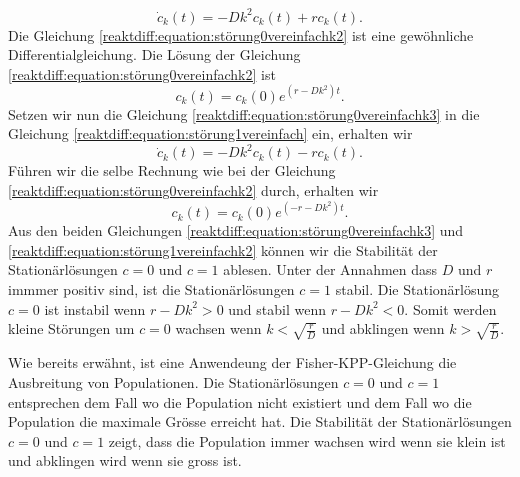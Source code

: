 \begin{equation}
\label{reaktdiff:equation:störung0vereinfachk2}
\dot{c}_k(t) = -D k^2 c_k(t) + r c_k(t).
\end{equation}
Die Gleichung \ref{reaktdiff:equation:störung0vereinfachk2} ist eine gewöhnliche Differentialgleichung.
Die Lösung der Gleichung \ref{reaktdiff:equation:störung0vereinfachk2} ist
\begin{equation}
\label{reaktdiff:equation:störung0vereinfachk3}
c_k(t) = c_k(0) e^{(r - D k^2)t}.
\end{equation}
Setzen wir nun die Gleichung \ref{reaktdiff:equation:störung0vereinfachk3} in die Gleichung \ref{reaktdiff:equation:störung1vereinfach} ein, erhalten wir
\begin{equation}
\label{reaktdiff:equation:störung1vereinfachk}
\dot{c}_k(t) = -D k^2 c_k(t) - r c_k(t).
\end{equation}
Führen wir die selbe Rechnung wie bei der Gleichung \ref{reaktdiff:equation:störung0vereinfachk2} durch, erhalten wir
\begin{equation}
\label{reaktdiff:equation:störung1vereinfachk2}
c_k(t) = c_k(0) e^{(-r - D k^2)t}.
\end{equation}
Aus den beiden Gleichungen \ref{reaktdiff:equation:störung0vereinfachk3} und \ref{reaktdiff:equation:störung1vereinfachk2} können wir die Stabilität der Stationärlösungen \(c = 0\) und \(c = 1\) ablesen.
Unter der Annahmen dass \(D\) und \(r\) immmer positiv sind, ist die Stationärlösungen \(c = 1\) stabil.
Die Stationärlösung \(c = 0\) ist instabil wenn \(r-Dk^2 > 0\) und stabil wenn \(r-Dk^2 < 0\).
Somit werden kleine Störungen um \(c = 0\) wachsen wenn \(k < \sqrt{\frac{r}{D}}\) und abklingen wenn \(k > \sqrt{\frac{r}{D}}\).

Wie bereits erwähnt, ist eine Anwendeung der Fisher-KPP-Gleichung die Ausbreitung von Populationen.
Die Stationärlösungen \(c = 0\) und \(c = 1\) entsprechen dem Fall wo die Population nicht existiert und dem Fall wo die Population die maximale Grösse erreicht hat.
Die Stabilität der Stationärlösungen \(c = 0\) und \(c = 1\) zeigt, dass die Population immer wachsen wird wenn sie klein ist und abklingen wird wenn sie gross ist.

